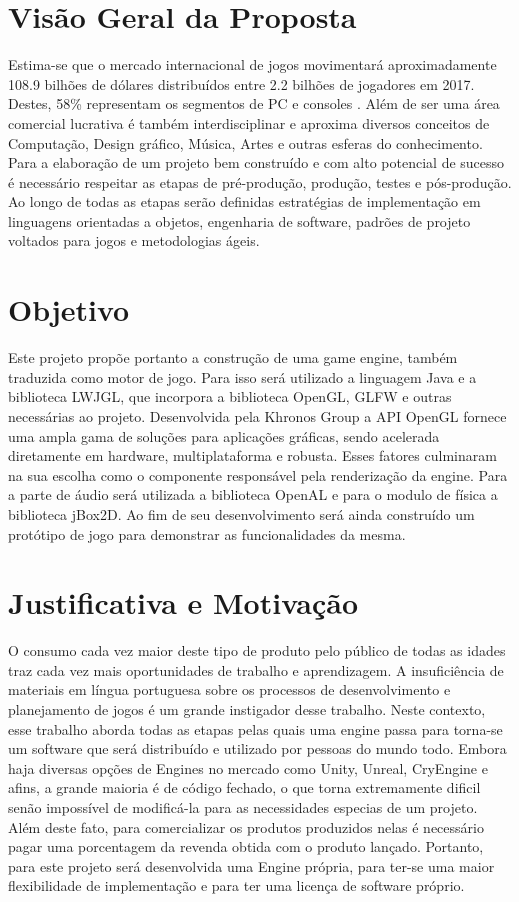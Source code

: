 \documentclass[12pt, 
openright, 
oneside, 
a4paper,    
brazil]{facom-ufu-abntex2}
\begin{document}
\section{Visão Geral da Proposta}
Estima-se que o mercado internacional de jogos movimentará aproximadamente 108.9
bilhões de dólares distribuídos entre 2.2 bilhões de jogadores em 2017. Destes, 58\%
representam os segmentos de PC e consoles \cite{GameMarketArticle}. Além de ser uma área
comercial lucrativa é também interdisciplinar e aproxima
diversos conceitos de Computação, Design gráfico, Música, Artes e outras esferas do
conhecimento.
Para a elaboração de um projeto bem construído e com alto potencial de
sucesso é necessário respeitar as etapas de pré-produção, produção, testes
e pós-produção. Ao longo de todas as etapas serão definidas estratégias de
implementação em linguagens orientadas a objetos, engenharia de software, padrões de projeto
voltados para jogos e metodologias ágeis.

\section{Objetivo}
Este projeto propõe portanto a construção de uma game engine, também traduzida como motor de jogo. Para isso será utilizado a linguagem Java e a biblioteca LWJGL, que incorpora a biblioteca OpenGL, GLFW e outras necessárias ao projeto.
Desenvolvida pela Khronos Group a API OpenGL fornece uma ampla gama de soluções para aplicações gráficas, sendo acelerada diretamente em
hardware, multiplataforma e robusta. Esses fatores culminaram na sua escolha como o componente responsável pela renderização da engine. Para a parte de áudio será utilizada a biblioteca OpenAL e para o modulo de física a biblioteca jBox2D. 
Ao fim de seu desenvolvimento será ainda construído um protótipo de jogo para demonstrar as funcionalidades da mesma. %

\section{Justificativa e Motivação}
O consumo cada vez maior deste tipo de produto pelo público de todas as idades traz cada vez mais oportunidades de trabalho e aprendizagem.
A insuficiência de materiais em língua portuguesa sobre os processos de desenvolvimento e planejamento de jogos é um grande instigador desse trabalho. Neste contexto, esse trabalho aborda todas as etapas pelas quais uma engine passa para torna-se um software que será distribuído e utilizado por pessoas do mundo todo.
Embora haja diversas opções de Engines no mercado como Unity, Unreal, CryEngine e afins, a grande maioria é de código fechado, o que torna extremamente dificil senão impossível de modificá-la para as necessidades especias de um projeto. Além deste fato, para comercializar os produtos produzidos nelas é necessário pagar uma porcentagem da revenda obtida com o produto lançado. Portanto, para este projeto será desenvolvida uma Engine própria, para ter-se uma maior flexibilidade de implementação e para ter uma licença de software próprio.
\end{document}
